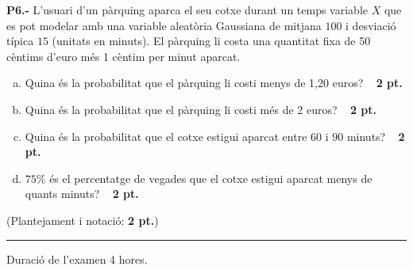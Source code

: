 \documentclass{report}
\begin{document}
\vspace{0.5 cm}
\noindent\textbf{P6.-}
L'usuari d'un pàrquing aparca el seu cotxe durant un temps variable $X$
que es pot modelar amb una variable aleatòria Gaussiana de mitjana $100$
i desviació típica $15$ (unitats en minuts).
El pàrquing li costa una quantitat fixa de 50 cèntims d'euro més
1 cèntim per minut aparcat.
\begin{enumerate}[a)]
\item Quina és la probabilitat que el pàrquing li costi menys de 1,20 euros?
\ \hfill{\textbf{ 2 pt.}}

\item Quina és la probabilitat que el pàrquing li costi més de 2 euros?
\ \hfill{\textbf{ 2 pt.}}

\item Quina és la probabilitat que el cotxe estigui aparcat entre $60$ i $90$ minuts?
\ \hfill{\textbf{ 2 pt.}}

\item $75\%$ és el percentatge de vegades que el cotxe estigui aparcat menys de quants minuts?
\ \hfill{\textbf{ 2 pt.}}

\end{enumerate}
(Plantejament i notació: \textbf{ 2 pt.})

\vskip 5cm
\hrule

\vspace{0.25 cm}

\noindent Duraci\'o de l'examen 4 hores.\newline
\end{document}
